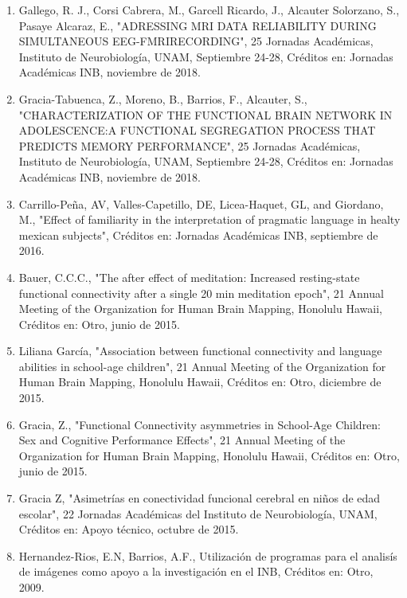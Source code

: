 \begin{enumerate}
\item  Gallego, R. J., Corsi Cabrera, M., Garcell Ricardo, J., Alcauter Solorzano, S., Pasaye Alcaraz, E., "ADRESSING MRI 
DATA 
RELIABILITY DURING SIMULTANEOUS EEG-FMRIRECORDING", 25 Jornadas Académicas, Instituto de Neurobiología, UNAM, Septiembre 
24-28, Créditos en: Jornadas Académicas INB, noviembre de 2018.

\item  Gracia-Tabuenca, Z., Moreno, B., Barrios, F., Alcauter, S., "CHARACTERIZATION OF THE FUNCTIONAL BRAIN NETWORK IN 
ADOLESCENCE:A FUNCTIONAL SEGREGATION PROCESS THAT PREDICTS MEMORY PERFORMANCE", 25 Jornadas Académicas, Instituto de 
Neurobiología, UNAM, Septiembre 24-28, Créditos en: Jornadas Académicas INB, noviembre de 2018.

\item  Carrillo-Peña, AV, Valles-Capetillo, DE, Licea-Haquet, GL, and Giordano, M., "Effect of familiarity in the 
interpretation 
of pragmatic language in healty mexican subjects", Créditos en: Jornadas Académicas INB, septiembre de 2016.

\item  Bauer, C.C.C., "The after effect of meditation: Increased resting-state functional connectivity after a single 20 min 
meditation epoch", 21 Annual Meeting of the Organization for Human Brain Mapping, Honolulu Hawaii, Créditos en: Otro, junio 
de 2015.

\item  Liliana García, "Association between functional connectivity and language abilities in school-age children", 21 Annual 
Meeting of the Organization for Human Brain Mapping, Honolulu Hawaii, Créditos en: Otro, diciembre de 2015.

\item  Gracia, Z., "Functional Connectivity asymmetries in School-Age Children: Sex and Cognitive Performance Effects", 21 
Annual Meeting of the Organization for Human Brain Mapping, Honolulu Hawaii, Créditos en: Otro, junio de 2015.

\item  Gracia Z, "Asimetrías en conectividad funcional cerebral en niños de edad escolar", 22 Jornadas Académicas del 
Instituto 
de Neurobiología, UNAM, Créditos en: Apoyo técnico, octubre de 2015.

\item  Hernandez-Rios, E.N, Barrios, A.F., Utilización de programas para el analisís de imágenes como apoyo a la 
investigación 
en el INB, Créditos en: Otro, 2009.


\end{enumerate}
